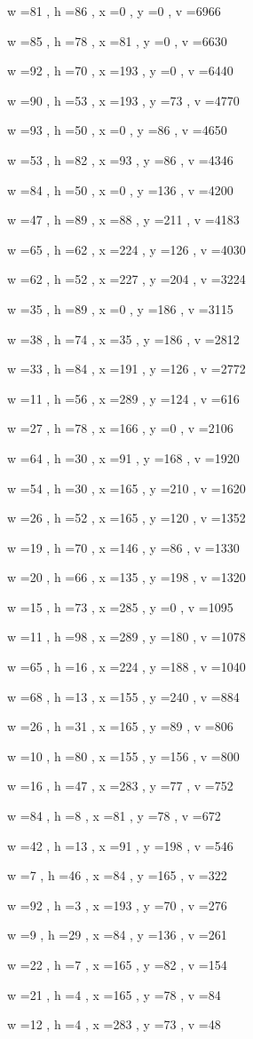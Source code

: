 \documentclass[11pt]{article}
\begin{document}
w =81 , h =86 , x =0 , y =0 , v =6966
\par
w =85 , h =78 , x =81 , y =0 , v =6630
\par
w =92 , h =70 , x =193 , y =0 , v =6440
\par
w =90 , h =53 , x =193 , y =73 , v =4770
\par
w =93 , h =50 , x =0 , y =86 , v =4650
\par
w =53 , h =82 , x =93 , y =86 , v =4346
\par
w =84 , h =50 , x =0 , y =136 , v =4200
\par
w =47 , h =89 , x =88 , y =211 , v =4183
\par
w =65 , h =62 , x =224 , y =126 , v =4030
\par
w =62 , h =52 , x =227 , y =204 , v =3224
\par
w =35 , h =89 , x =0 , y =186 , v =3115
\par
w =38 , h =74 , x =35 , y =186 , v =2812
\par
w =33 , h =84 , x =191 , y =126 , v =2772
\par
w =11 , h =56 , x =289 , y =124 , v =616
\par
w =27 , h =78 , x =166 , y =0 , v =2106
\par
w =64 , h =30 , x =91 , y =168 , v =1920
\par
w =54 , h =30 , x =165 , y =210 , v =1620
\par
w =26 , h =52 , x =165 , y =120 , v =1352
\par
w =19 , h =70 , x =146 , y =86 , v =1330
\par
w =20 , h =66 , x =135 , y =198 , v =1320
\par
w =15 , h =73 , x =285 , y =0 , v =1095
\par
w =11 , h =98 , x =289 , y =180 , v =1078
\par
w =65 , h =16 , x =224 , y =188 , v =1040
\par
w =68 , h =13 , x =155 , y =240 , v =884
\par
w =26 , h =31 , x =165 , y =89 , v =806
\par
w =10 , h =80 , x =155 , y =156 , v =800
\par
w =16 , h =47 , x =283 , y =77 , v =752
\par
w =84 , h =8 , x =81 , y =78 , v =672
\par
w =42 , h =13 , x =91 , y =198 , v =546
\par
w =7 , h =46 , x =84 , y =165 , v =322
\par
w =92 , h =3 , x =193 , y =70 , v =276
\par
w =9 , h =29 , x =84 , y =136 , v =261
\par
w =22 , h =7 , x =165 , y =82 , v =154
\par
w =21 , h =4 , x =165 , y =78 , v =84
\par
w =12 , h =4 , x =283 , y =73 , v =48
\par
\newpage
\end{document}
